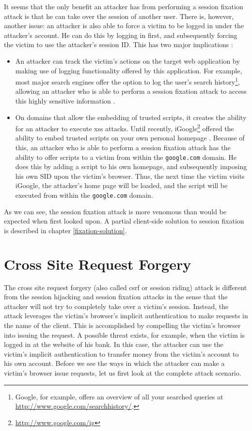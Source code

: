 It seems that the only benefit an attacker has from performing a session fixation attack is that he can take over the session of another user. There is, however, another issue: an attacker is also able to force a victim to be logged in under the attacker's account. He can do this by logging in first, and subsequently forcing the victim to use the attacker's session ID. This has two major implications \cite{Barth2008}:
\begin{itemize}
	\item An attacker can track the victim's actions on the target web application by making use of logging functionality offered by this application. For example, most major search engines offer the option to log the user's search history\footnote{Google, for example, offers an overview of all your searched queries at \url{http://www.google.com/searchhistory/}.}, allowing an attacker who is able to perform a session fixation attack to access this highly sensitive information \cite{Barbaro2006}.
	\item On domains that allow the embedding of trusted scripts, it creates the ability for an attacker to execute \gls{xss} attacks. Until recently, iGoogle\footnote{\url{http://www.google.com/ig}} offered the ability to embed trusted scripts on your own personal homepage \cite{Barth2008}. Because of this, an attacker who is able to perform a session fixation attack has the ability to offer scripts to a victim from within the \texttt{google.com} domain. He does this by adding a script to his own homepage, and subsequently imposing his own SID upon the victim's browser. Thus, the next time the victim visits iGoogle, the attacker's home page will be loaded, and the script will be executed from within the \texttt{google.com} domain.
\end{itemize}

As we can see, the session fixation attack is more venomous than would be expected when first looked upon. A partial client-side solution to session fixation is described in chapter \ref{fixation-solution}.

\section{Cross Site Request Forgery}\label{csrf}

The cross site request forgery (also called \gls{csrf} or session riding) attack is different from the \gls{session hijacking} and \gls{session fixation} attacks in the sense that the attacker will not try to completely take over a victim's session. Instead, the attack leverages the victim's browser's implicit authentication to make requests in the name of the client. This is accomplished by compelling the victim's browser into issuing the request. A possible threat exists, for example, when the victim is logged in at the website of his bank. In this case, the attacker can use the victim's implicit authentication to transfer money from the victim's account to his own account. Before we see the ways in which the attacker can make a victim's browser issue requests, let us first look at the complete attack scenario.

